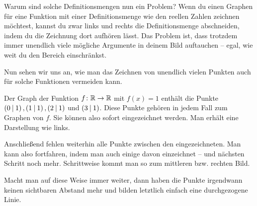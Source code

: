 \documentclass[../../main.tex]{subfiles}
\begin{document}
Warum sind solche Definitionsmengen nun ein Problem? Wenn du einen Graphen für eine Funktion mit einer Definitionsmenge wie den reellen Zahlen zeichnen möchtest, kannst du zwar links und rechts die Definitionsmenge abschneiden, indem du die Zeichnung dort aufhören lässt. Das Problem ist, dass trotzdem immer unendlich viele mögliche Argumente in deinem Bild auftauchen -- egal, wie weit du den Bereich einschränkst.

Nun sehen wir uns an, wie man das Zeichnen von unendlich vielen Punkten auch für solche Funktionen vermeiden kann.

\begin{example}{}
    \begin{minipage}{\textwidth}
        Der Graph der Funktion $f\colon\mathbb{R}\rightarrow\mathbb{R}$ mit $f(x)=1$ enthält die Punkte $\left(0 \:\middle|\: 1\right), \left(1 \:\middle|\: 1\right), \left(2 \:\middle|\: 1\right)$ und $\left(3 \:\middle|\: 1\right)$. Diese Punkte gehören in jedem Fall zum Graphen von $f$. Sie können also sofort eingezeichnet werden. Man erhält eine Darstellung wie links.
        
        Anschließend fehlen weiterhin alle Punkte zwischen den eingezeichneten. Man kann also fortfahren, indem man auch einige davon einzeichnet -- und nächsten Schritt noch mehr. Schrittweise kommt man so zum mittleren bzw. rechten Bild.
        
        Macht man auf diese Weise immer weiter, dann haben die Punkte irgendwann keinen sichtbaren Abstand mehr und bilden letztlich einfach eine durchgezogene Linie.
        
        \begin{multicols}{3}
            \centering
\end{multicols}
\end{minipage}
\end{example}
\end{document}
